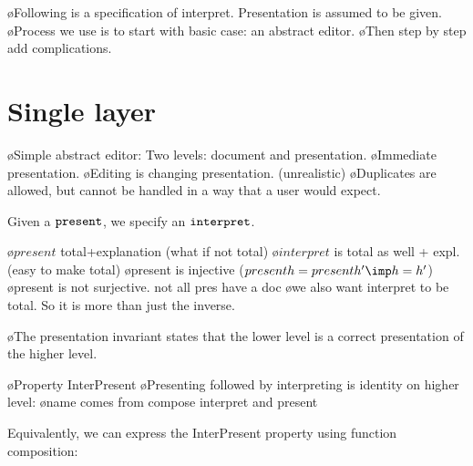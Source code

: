 \bl
\o Following is a specification of interpret. Presentation is assumed to be given.
\o Process we use is to start with basic case: an abstract editor. 
\o Then step by step add complications.
\el



%																
%																
%																
\section{Single layer} \label{sect:singleSimple}

\bl
\o Simple abstract editor: Two levels: document and presentation.
\o Immediate presentation.
\o Editing is changing presentation. (unrealistic)
\o Duplicates are allowed, but cannot be handled in a way that a user would expect.
\el


Given a ${\tt present}$, we specify an ${\tt interpret}$.


\bl
\o $present$ total+explanation (what if not total)
\o $interpret$ is total as well + expl. (easy to make total)
\o present is injective ($present h = present h' \imp h = h'$)
\o present is not surjective. not all pres have a doc
\o we also want interpret to be total. So it is more than just the inverse. 
\el
{}

\bl
\o The presentation invariant states that the lower level is a correct presentation of the higher level.
\el



\bl
\o Property {\sc InterPresent} 
\o Presenting followed by interpreting is identity on higher level: 
\o name comes from compose interpret and present
\el


Equivalently, we can express the {\sc InterPresent} property using function composition: 

